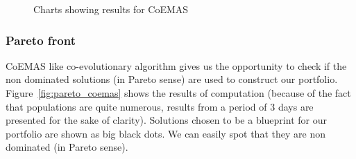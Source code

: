 \begin{figure}[htb]
  \caption{Charts showing results for CoEMAS}
\label{fig:CoEMAS_1}
\end{figure}


\subsubsection{Pareto front}

CoEMAS like co-evolutionary algorithm gives us the opportunity to check if the non dominated solutions (in Pareto sense) are used to construct our portfolio.
Figure~\ref{fig:pareto_coemas} shows the results of computation (because of the fact that populations are quite numerous,
 results from a period of 3 days are presented for the sake of clarity). 
Solutions chosen to be a blueprint for our portfolio are shown as big black dots.
We can easily spot that they are non dominated (in Pareto sense). 


